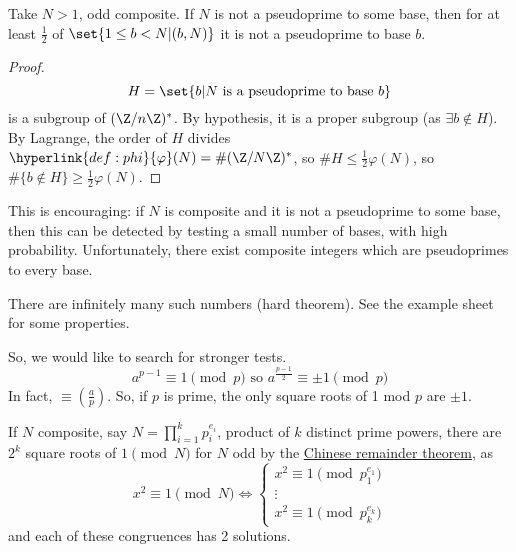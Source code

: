 \documentclass{article}
\newcommand{\legendre}[2]{\genfrac{(}{)}{}{}{#1}{#2}}
\begin{document}
\begin{nprop}\label{prop:7.1}
    Take $N>1$, odd composite.
    If $N$ is not a pseudoprime to some base, then for at least $\frac{1}{2}$ of $\set{1 \leq b < N | (b, N)}$ it is not a pseudoprime to base $b$.
\end{nprop}
\begin{proof}
    \begin{equation*}
        H = \set{b | N \text{ is a pseudoprime to base } b}
    \end{equation*}
    is a subgroup of $(\Z/n\Z)^*$. By hypothesis, it is a proper subgroup (as $\exists b \notin H$).
    By Lagrange, the order of $H$ divides $\hyperlink{def:phi}{\varphi}(N) = \# (\Z/N\Z)^*$, so $\#H \leq \frac{1}{2} \varphi(N)$, so $\#\{b \notin H\} \geq \frac{1}{2} \varphi(N)$.
\end{proof}

This is encouraging: if $N$ is composite and it is not a pseudoprime to some base, then this can be detected by testing a small number of bases, with high probability.
Unfortunately, there exist composite integers which are pseudoprimes to every base.


\begin{fact}
    There are infinitely many such numbers (hard theorem). See the example sheet for some properties.
\end{fact}

So, we would like to search for stronger tests.
\begin{equation*}
    a^{p-1} \equiv 1 \pmod{p} \text{ so } a^{\frac{p-1}{2}} \equiv \pm 1 \pmod{p}
\end{equation*}
In fact, $\equiv \legendre{a}{p}$.
So, if $p$ is prime, the only square roots of 1 mod $p$ are $\pm 1$.

If $N$ composite, say $N = \prod_{i=1}^k p_i^{e_i}$, product of $k$ distinct prime powers, there are $2^k$ square roots of $1 \pmod{N}$ for $N$ odd by the \hyperlink{thm:crt}{Chinese remainder theorem}, as
\begin{equation*}
    x^2 \equiv 1 \pmod{N} \iff
    \begin{cases}
        x^2 \equiv 1 \pmod{p_1^{e_1}} \\
        \vdots \\
        x^2 \equiv 1 \pmod{p_k^{e_k}}
    \end{cases}
\end{equation*}
and each of these congruences has 2 solutions.
\end{document}
